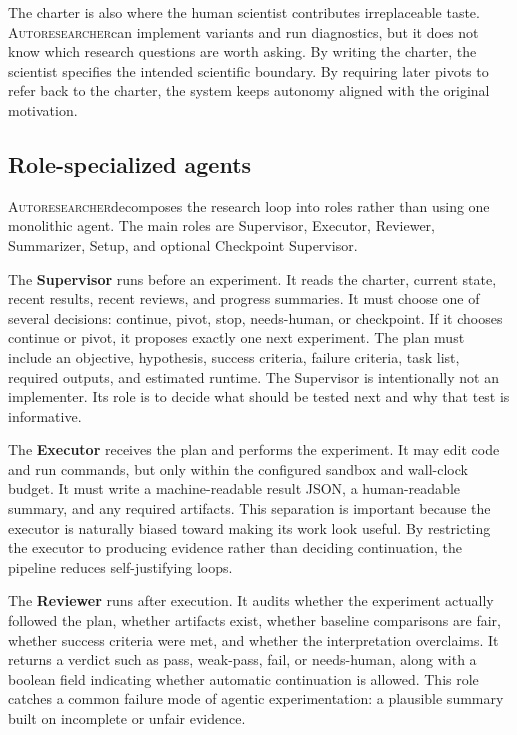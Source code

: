 \documentclass{article}
\newcommand{\sys}{\textsc{Autoresearcher}}
\begin{document}
The charter is also where the human scientist contributes irreplaceable taste. \sys can implement variants and run diagnostics, but it does not know which research questions are worth asking. By writing the charter, the scientist specifies the intended scientific boundary. By requiring later pivots to refer back to the charter, the system keeps autonomy aligned with the original motivation.

\subsection{Role-specialized agents}

\sys decomposes the research loop into roles rather than using one monolithic agent. The main roles are Supervisor, Executor, Reviewer, Summarizer, Setup, and optional Checkpoint Supervisor.

The \textbf{Supervisor} runs before an experiment. It reads the charter, current state, recent results, recent reviews, and progress summaries. It must choose one of several decisions: continue, pivot, stop, needs-human, or checkpoint. If it chooses continue or pivot, it proposes exactly one next experiment. The plan must include an objective, hypothesis, success criteria, failure criteria, task list, required outputs, and estimated runtime. The Supervisor is intentionally not an implementer. Its role is to decide what should be tested next and why that test is informative.

The \textbf{Executor} receives the plan and performs the experiment. It may edit code and run commands, but only within the configured sandbox and wall-clock budget. It must write a machine-readable result JSON, a human-readable summary, and any required artifacts. This separation is important because the executor is naturally biased toward making its work look useful. By restricting the executor to producing evidence rather than deciding continuation, the pipeline reduces self-justifying loops.

The \textbf{Reviewer} runs after execution. It audits whether the experiment actually followed the plan, whether artifacts exist, whether baseline comparisons are fair, whether success criteria were met, and whether the interpretation overclaims. It returns a verdict such as pass, weak-pass, fail, or needs-human, along with a boolean field indicating whether automatic continuation is allowed. This role catches a common failure mode of agentic experimentation: a plausible summary built on incomplete or unfair evidence.
\end{document}
